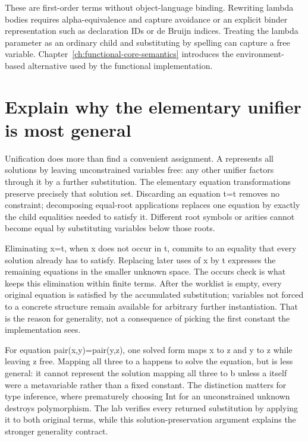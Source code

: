 These are first-order terms without object-language binding.
Rewriting lambda bodies requires alpha-equivalence and capture avoidance or an explicit binder representation such as declaration IDs or de Bruijn indices.
Treating the lambda parameter as an ordinary child and substituting by spelling can capture a free variable.
Chapter~\ref{ch:functional-core-semantics} introduces the environment-based alternative used by the functional implementation.

\section{Explain why the elementary unifier is most general}
\label{sec:ch82-generality}
Unification does more than find a convenient assignment.
A  represents all solutions by leaving unconstrained variables free: any other unifier factors through it by a further substitution.
The elementary equation transformations preserve precisely that solution set.
Discarding an equation t=t removes no constraint; decomposing equal-root applications replaces one equation by exactly the child equalities needed to satisfy it.
Different root symbols or arities cannot become equal by substituting variables below those roots.

Eliminating x=t, when x does not occur in t, commits to an equality that every solution already has to satisfy.
Replacing later uses of x by t expresses the remaining equations in the smaller unknown space.
The occurs check is what keeps this elimination within finite terms.
After the worklist is empty, every original equation is satisfied by the accumulated substitution; variables not forced to a concrete structure remain available for arbitrary further instantiation.
That is the reason for generality, not a consequence of picking the first constant the implementation sees.

For equation pair(x,y)=pair(y,z), one solved form maps x to z and y to z while leaving z free.
Mapping all three to a happens to solve the equation, but is less general: it cannot represent the solution mapping all three to b unless a itself were a metavariable rather than a fixed constant.
The distinction matters for type inference, where prematurely choosing Int for an unconstrained unknown destroys polymorphism.
The lab verifies every returned substitution by applying it to both original terms, while this solution-preservation argument explains the stronger generality contract.

